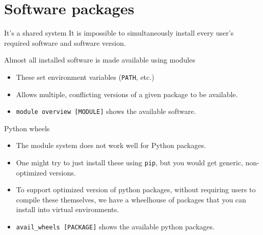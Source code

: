 \documentclass[
  10pt,
  ignorenonframetext,
  aspectratio=169,handout]{beamer}
\begin{document}
\section{Software packages}\label{software-packages}

\begin{frame}[fragile]{It's a shared system}
\label{its-a-shared-system}
It is impossible to simultaneously install every user's required software and software version.

\pause

\begin{block}{Almost all installed software is made available using modules}\setlength{\parskip}{0.5\baselineskip}
\label{almost-all-installed-software-is-made-available-using-modules}
\pause

\begin{itemize}
\item
  These set environment variables (\texttt{PATH}, etc.)

  \pause
\item
  Allows multiple, conflicting versions of a given package to be available.

  \pause
\item
  \alert{\texttt{module\ overview\ {[}MODULE{]}}} shows the available software.
\end{itemize}

\pause
\end{block}

\begin{block}{Python wheels}\setlength{\parskip}{0.5\baselineskip}
\label{python-wheels}
\begin{itemize}
\item
  The module system does not work well for Python packages.

  \pause
\item
  One might try to just install these using \texttt{pip}, but you would get generic, non-optimized versions.

  \pause
\item
  To support optimized version of python packages, without requiring users to compile these themselves, we have a \alert{wheelhouse} of packages that you can install into \alert{virtual environments}.

  \pause
\item
  \alert{\texttt{avail\_wheels\ {[}PACKAGE{]}}} shows the available python packages.
\end{itemize}
\end{block}
\end{frame}
\end{document}
